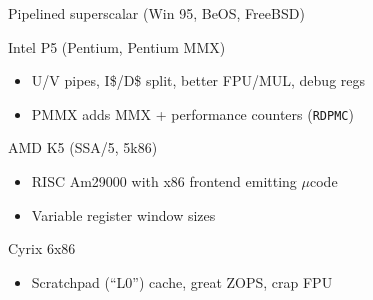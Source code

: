 \documentclass[mathserif,xcolor={dvipsnames,table}]{beamer}
\begin{document}
\begin{frame}[t]{Pipelined superscalar (Win 95, BeOS, FreeBSD)}
\begin{block}{Intel P5 (Pentium, Pentium MMX)}
\begin{itemize}
\item U/V pipes, I\$/D\$ split, better FPU/MUL, debug regs
\item PMMX adds MMX + performance counters (\texttt{RDPMC})
\end{itemize}
\end{block}
\begin{block}{AMD K5 (SSA/5, 5k86)}
\begin{itemize}
\item RISC Am29000 with x86 frontend emitting $\mu$code
\item Variable register window sizes
\end{itemize}
\end{block}
\begin{block}{Cyrix 6x86}
\begin{itemize}
\item Scratchpad (``L0'') cache, great ZOPS, crap FPU
\end{itemize}
\end{block}
\vfill
\begin{center}
\end{center}
\end{frame}
\end{document}
